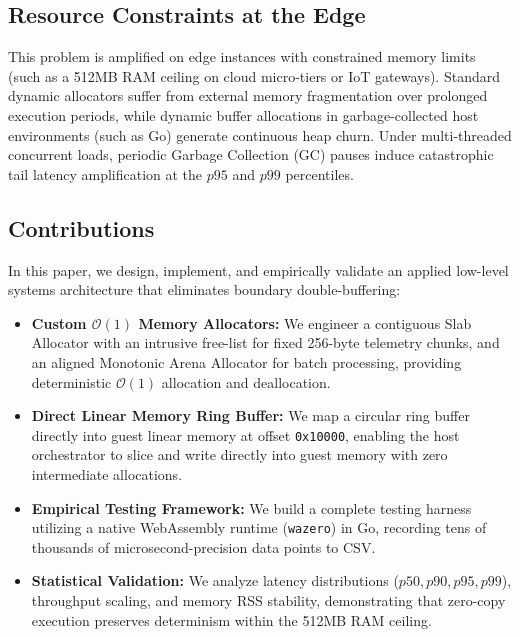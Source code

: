 \subsection{Resource Constraints at the Edge}
This problem is amplified on edge instances with constrained memory limits (such as a 512MB RAM ceiling on cloud micro-tiers or IoT gateways). Standard dynamic allocators suffer from external memory fragmentation over prolonged execution periods, while dynamic buffer allocations in garbage-collected host environments (such as Go) generate continuous heap churn. Under multi-threaded concurrent loads, periodic Garbage Collection (GC) pauses induce catastrophic tail latency amplification at the $p95$ and $p99$ percentiles.

\subsection{Contributions}
In this paper, we design, implement, and empirically validate an applied low-level systems architecture that eliminates boundary double-buffering:
\begin{itemize}
    \item \textbf{Custom $\mathcal{O}(1)$ Memory Allocators:} We engineer a contiguous Slab Allocator with an intrusive free-list for fixed 256-byte telemetry chunks, and an aligned Monotonic Arena Allocator for batch processing, providing deterministic $\mathcal{O}(1)$ allocation and deallocation.
    \item \textbf{Direct Linear Memory Ring Buffer:} We map a circular ring buffer directly into guest linear memory at offset \texttt{0x10000}, enabling the host orchestrator to slice and write directly into guest memory with zero intermediate allocations.
    \item \textbf{Empirical Testing Framework:} We build a complete testing harness utilizing a native WebAssembly runtime (\texttt{wazero}) in Go, recording tens of thousands of microsecond-precision data points to CSV.
    \item \textbf{Statistical Validation:} We analyze latency distributions ($p50, p90, p95, p99$), throughput scaling, and memory RSS stability, demonstrating that zero-copy execution preserves determinism within the 512MB RAM ceiling.
\end{itemize}
